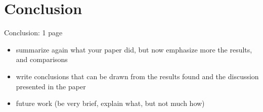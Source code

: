 
\chapter{Conclusion}%
\label{sec:conclusion}

Conclusion: 1 page

\begin{itemize}
    \item summarize again what your paper did, but now emphasize more the results, and comparisons
    \item write conclusions that can be drawn from the results found and the discussion presented in the paper
    \item future work (be very brief, explain what, but not much how)
\end{itemize}
